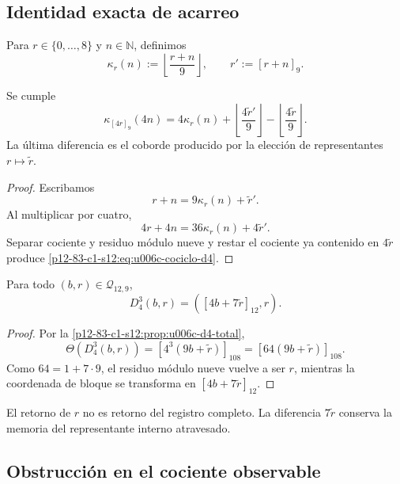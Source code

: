 \subsection{Identidad exacta de acarreo}

Para \(r\in\{0,\ldots,8\}\) y \(n\in\mathbb N\), definimos
\[
 \kappa_r(n):=\left\lfloor\frac{r+n}{9}\right\rfloor,
 \qquad
 r':=[r+n]_9.
\]

\begin{theorem}
\label{p12-83-c1-s12:thm:u006c-cociclo-d4}
Se cumple
\begin{equation}
 \boxed{
 \kappa_{[4r]_9}(4n)
 =4\kappa_r(n)
 +\left\lfloor\frac{4\widetilde r'}{9}\right\rfloor
 -\left\lfloor\frac{4\widetilde r}{9}\right\rfloor.}
 \label{p12-83-c1-s12:eq:u006c-cociclo-d4}
\end{equation}
La última diferencia es el coborde producido por la elección de
representantes \(r\mapsto\widetilde r\).
\end{theorem}

\begin{proof}
Escribamos
\[
 r+n=9\kappa_r(n)+\widetilde r'.
\]
Al multiplicar por cuatro,
\[
 4r+4n=36\kappa_r(n)+4\widetilde r'.
\]
Separar cociente y residuo módulo nueve y restar el cociente ya contenido en
\(4\widetilde r\) produce
\eqref{p12-83-c1-s12:eq:u006c-cociclo-d4}.
\end{proof}

\begin{corollary}
\label{p12-83-c1-s12:cor:u006c-tercera-iteracion}
Para todo \((b,r)\in\mathcal Q_{12,9}\),
\begin{equation}
 \boxed{D_4^3(b,r)=([4b+7\widetilde r]_{12},r).}
 \label{p12-83-c1-s12:eq:u006c-d4-cubo}
\end{equation}
\end{corollary}

\begin{proof}
Por la \cref{p12-83-c1-s12:prop:u006c-d4-total},
\[
 \Theta(D_4^3(b,r))
 =[4^3(9b+\widetilde r)]_{108}
 =[64(9b+\widetilde r)]_{108}.
\]
Como \(64=1+7\cdot9\), el residuo módulo nueve vuelve a ser \(r\), mientras
la coordenada de bloque se transforma en
\([4b+7\widetilde r]_{12}\).
\end{proof}

El retorno de \(r\) no es retorno del registro completo. La diferencia
\(7\widetilde r\) conserva la memoria del representante interno atravesado.

\subsection{Obstrucción en el cociente observable}

